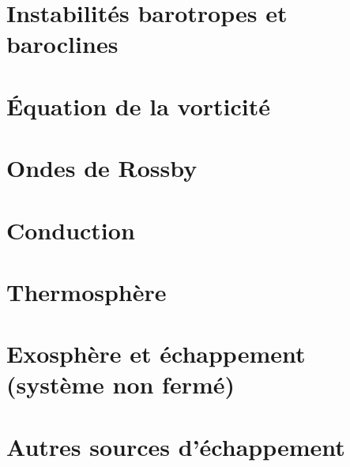 \documentclass[a4paper,DIV16,10pt]{scrartcl}
\begin{document}
 \inidoc

\newpage \section{Instabilités barotropes et baroclines} 

\newpage \section{\'Equation de la vorticité} 

\newpage \section{Ondes de Rossby} 


\newpage
\section{Conduction}


\newpage
\section{Thermosphère}


\newpage
\section{Exosphère et échappement (système non fermé)}


\newpage
\section{Autres sources d'échappement}


\end{document}
